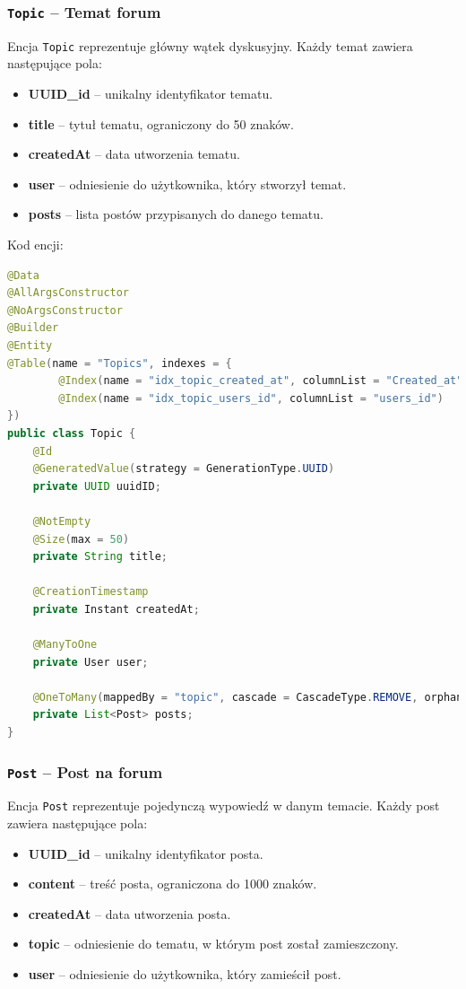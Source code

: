 \subsubsection{\texttt{Topic} -- Temat forum}
Encja \texttt{Topic} reprezentuje główny wątek dyskusyjny. Każdy temat zawiera następujące pola:
\begin{itemize}
    \item \textbf{UUID\_id} -- unikalny identyfikator tematu.
    \item \textbf{title} -- tytuł tematu, ograniczony do 50 znaków.
    \item \textbf{createdAt} -- data utworzenia tematu.
    \item \textbf{user} -- odniesienie do użytkownika, który stworzył temat.
    \item \textbf{posts} -- lista postów przypisanych do danego tematu.
\end{itemize}

Kod encji:
\begin{lstlisting}[language=Java, caption=Encja \texttt{Topic}]
@Data
@AllArgsConstructor
@NoArgsConstructor
@Builder
@Entity
@Table(name = "Topics", indexes = {
        @Index(name = "idx_topic_created_at", columnList = "Created_at"),
        @Index(name = "idx_topic_users_id", columnList = "users_id")
})
public class Topic {
    @Id
    @GeneratedValue(strategy = GenerationType.UUID)
    private UUID uuidID;

    @NotEmpty
    @Size(max = 50)
    private String title;

    @CreationTimestamp
    private Instant createdAt;

    @ManyToOne
    private User user;

    @OneToMany(mappedBy = "topic", cascade = CascadeType.REMOVE, orphanRemoval = true)
    private List<Post> posts;
}
\end{lstlisting}

\subsubsection{\texttt{Post} -- Post na forum}
Encja \texttt{Post} reprezentuje pojedynczą wypowiedź w danym temacie. Każdy post zawiera następujące pola:
\begin{itemize}
    \item \textbf{UUID\_id} -- unikalny identyfikator posta.
    \item \textbf{content} -- treść posta, ograniczona do 1000 znaków.
    \item \textbf{createdAt} -- data utworzenia posta.
    \item \textbf{topic} -- odniesienie do tematu, w którym post został zamieszczony.
    \item \textbf{user} -- odniesienie do użytkownika, który zamieścił post.
\end{itemize}

